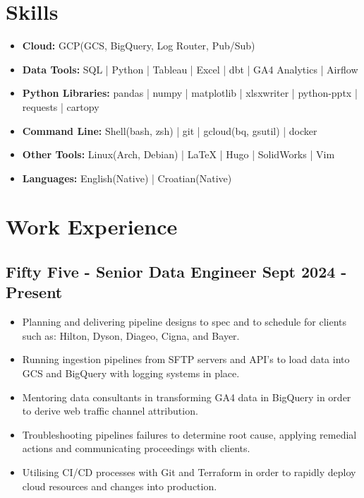 \documentclass[a4paper,9pt]{article}
\begin{document}
\section*{Skills}
\begin{itemize}
    \item[] \faCloud \hspace{1mm} \textbf{Cloud:} \hspace{16.7mm} GCP(GCS, BigQuery, Log Router, Pub/Sub)
    \item[] \faTachometer \hspace{1mm} \textbf{Data Tools:} \hspace{9.5mm}  SQL | Python | Tableau | Excel | dbt | GA4 Analytics | Airflow
    \item[] \faCog \hspace{1mm} \textbf{Python Libraries:} \hspace{0.4mm} pandas | numpy | matplotlib | xlsxwriter | python-pptx | requests | cartopy
    \item[] \faTerminal \hspace{1mm} \textbf{Command Line:} \hspace{2.5mm} Shell(bash, zsh) | git |  gcloud(bq, gsutil) | docker
    \item[] \faWrench \hspace{1mm} \textbf{Other Tools:} \hspace{8mm}  Linux(Arch, Debian) |  LaTeX  | Hugo | SolidWorks | Vim
    \item[] \faLanguage \hspace{1mm} \textbf{Languages:} \hspace{9.5mm} English(Native) |  Croatian(Native)
\end{itemize}

\section*{Work Experience}

\subsection*{\textbf{Fifty Five - Senior Data Engineer} \hfill  Sept 2024 - Present}
\begin{itemize}[noitemsep]
    \item Planning and delivering pipeline designs to spec and to schedule for clients such as: Hilton, Dyson, Diageo, Cigna, and Bayer.
    \item Running ingestion pipelines from SFTP servers and API's to load data into GCS and BigQuery with logging systems in place.
    \item Mentoring data consultants in transforming GA4 data in BigQuery in order to derive web traffic channel attribution.
    \item Troubleshooting pipelines failures to determine root cause, applying remedial actions and communicating proceedings with clients.
    \item Utilising CI/CD processes with Git and Terraform in order to rapidly deploy cloud resources and changes into production.
\end{itemize}
\end{document}
